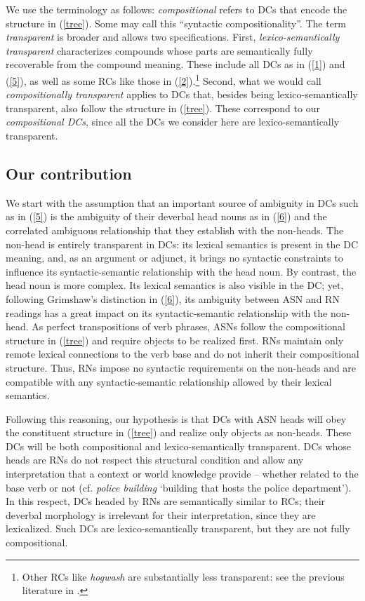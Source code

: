 \documentclass[output=paper]{langsci/langscibook}
\begin{document}
We use the terminology as follows: \textit{compositional} refers to DCs that encode the structure in (\ref{tree}). Some may call this ``syntactic compositionality''. The term \textit{transparent} is broader and allows two specifications. First,  \textit{lexico-semantically transparent}  characterizes compounds whose parts are semantically fully recoverable from the compound meaning. These include all DCs as in (\ref{1}) and (\ref{5}), as well as some RCs like those in (\ref{2}).\footnote{Other RCs like \textit{hogwash} are substantially less transparent: see the previous literature in .}  Second, 
what we would call \textit{compositionally transparent} applies to DCs that, besides being lexico-semantically transparent, also follow the structure in (\ref{tree}). These correspond to our \textit{compositional DCs}, since all the DCs we consider here are lexico-semantically transparent.



\subsection{Our contribution}\label{sec:intro:contribution}
 We start with the assumption that an important source of ambiguity  in DCs such as in (\ref{5}) is the ambiguity of their deverbal head nouns as in (\ref{6}) and the correlated ambiguous relationship that they establish with the non-heads.  The non-head is entirely transparent in DCs: its lexical semantics is present in the DC meaning, and, as an argument or adjunct, it brings no syntactic constraints to influence its syntactic-semantic relationship with the head noun. By contrast, the head noun is more complex. Its lexical semantics is also visible in the DC; yet, following Grimshaw's distinction in (\ref{6}), its ambiguity between ASN and RN readings has a great impact on its syntactic-semantic relationship with the non-head. As perfect  transpositions of verb phrases, ASNs follow the compositional structure in (\ref{tree}) and require objects to be realized first. RNs maintain only remote lexical connections to the verb base and do not inherit their compositional structure. Thus, RNs impose no syntactic requirements on the non-heads and are compatible with any syntactic-semantic relationship allowed by their lexical semantics.


 Following this reasoning, our hypothesis is that DCs with ASN heads will obey the constituent structure  in (\ref{tree}) and realize only objects as non-heads. These DCs will be both compositional  and lexico-semantically transparent. DCs whose heads are RNs  do not respect this structural condition and allow any interpretation that a context  or world knowledge provide -- whether related to the base verb or not  (cf. \textit{police building} \lq building that hosts the police department\rq). In this respect, DCs headed by RNs are semantically similar to RCs; their deverbal morphology is irrelevant for their interpretation, since they are lexicalized.  Such DCs are lexico-semantically transparent, but they are not fully compositional.
\end{document}

